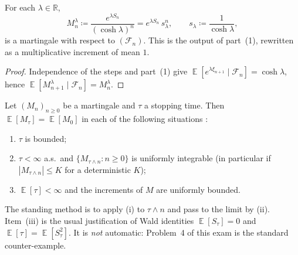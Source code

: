 \documentclass[11pt,a4paper]{article}
\DeclareMathOperator{\E}{\mathbb{E}}
\begin{document}
\begin{proposition}
\label{prop:exp-mg-srw}
For each \( \lambda\in\mathbb{R} \),
\[
M_n^{\lambda}
\coloneqq
\frac{e^{\lambda S_n}}{(\cosh\lambda)^{n}}
=
e^{\lambda S_n}\,s_{\lambda}^{n},
\qquad
s_{\lambda}
\coloneqq
\frac{1}{\cosh\lambda},
\]
is a martingale with respect to \( (\mathcal{F}_n) \). This is the output of part~(1), rewritten as a multiplicative increment of mean \( 1 \).
\end{proposition}

\begin{proof}
Independence of the steps and part~(1) give \( \E[e^{\lambda\xi_{n+1}}\mid\mathcal{F}_n]=\cosh\lambda \), hence \( \E[M_{n+1}^{\lambda}\mid\mathcal{F}_n]=M_n^{\lambda} \).
\end{proof}

\begin{theorem}
\label{thm:ost-discrete}
Let \( (M_n)_{n\ge 0} \) be a martingale and \( \tau \) a stopping time. Then \( \E[M_{\tau}]=\E[M_0] \) in each of the following situations \citep[Theorems~5.7.3--5.7.6]{durrett2010}:
\begin{enumerate}[label=\textup{(\roman*)}]
    \item
    \( \tau \) is bounded;
    \item
    \( \tau<\infty \) a.s.\ and \( \{M_{\tau\wedge n}:n\ge 0\} \) is uniformly integrable (in particular if \( |M_{\tau\wedge n}|\le K \) for a deterministic \( K \));
    \item
    \( \E[\tau]<\infty \) and the increments of \( M \) are uniformly bounded.
\end{enumerate}
The standing method is to apply (i) to \( \tau\wedge n \) and pass to the limit by (ii). Item~(iii) is the usual justification of Wald identities \( \E[S_{\tau}]=0 \) and \( \E[\tau]=\E[S_{\tau}^{2}] \). It is \emph{not} automatic: Problem~4 of this exam is the standard counter-example.
\end{theorem}
\end{document}
